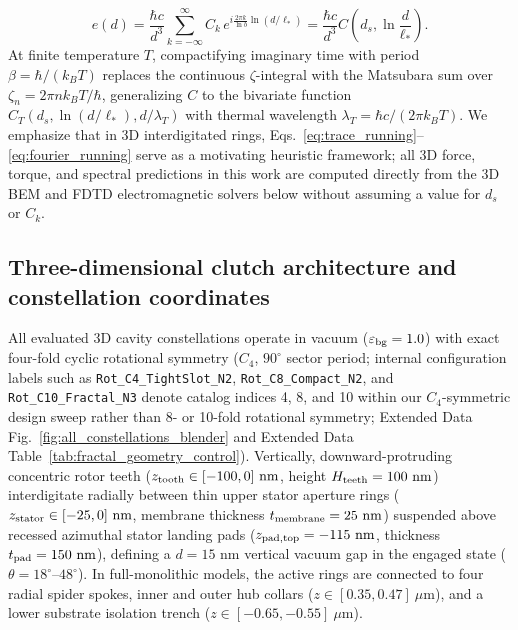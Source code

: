 \documentclass[pdflatex,sn-nature]{sn-jnl}
\begin{document}
\begin{equation}
e(d) = \frac{\hbar c}{d^3} \sum_{k=-\infty}^{\infty} C_k \, e^{i \frac{2\pi k}{\ln b} \ln(d/\ell_*)} = \frac{\hbar c}{d^3} C\!\left(d_s, \ln\frac{d}{\ell_*}\right).
\end{equation}
At finite temperature $T$, compactifying imaginary time with period $\beta = \hbar/(k_B T)$ replaces the continuous $\zeta$-integral with the Matsubara sum over $\zeta_n = 2\pi n k_B T/\hbar$, generalizing $C$ to the bivariate function $C_T(d_s, \ln(d/\ell_*), d/\lambda_T)$ with thermal wavelength $\lambda_T = \hbar c / (2\pi k_B T)$\cite{gordon2026prd}. We emphasize that in 3D interdigitated rings, Eqs.~\eqref{eq:trace_running}--\eqref{eq:fourier_running} serve as a motivating heuristic framework; all 3D force, torque, and spectral predictions in this work are computed directly from the 3D BEM and FDTD electromagnetic solvers below without assuming a value for $d_s$ or $C_k$.

\subsection*{Three-dimensional clutch architecture and constellation coordinates}
All evaluated 3D cavity constellations operate in vacuum ($\varepsilon_{\rm bg}=1.0$) with exact four-fold cyclic rotational symmetry ($C_4$, $90^\circ$ sector period; internal configuration labels such as \texttt{Rot\_C4\_TightSlot\_N2}, \texttt{Rot\_C8\_Compact\_N2}, and \texttt{Rot\_C10\_Fractal\_N3} denote catalog indices 4, 8, and 10 within our $C_4$-symmetric design sweep rather than 8- or 10-fold rotational symmetry; Extended Data Fig.~\ref{fig:all_constellations_blender} and Extended Data Table~\ref{tab:fractal_geometry_control}). Vertically, downward-protruding concentric rotor teeth ($z_{\rm tooth} \in [-100, 0]\text{ nm}$, height $H_{\rm teeth} = 100\text{ nm}$) interdigitate radially between thin upper stator aperture rings ($z_{\rm stator} \in [-25, 0]\text{ nm}$, membrane thickness $t_{\rm membrane} = 25\text{ nm}$) suspended above recessed azimuthal stator landing pads ($z_{\rm pad,top} = -115\text{ nm}$, thickness $t_{\rm pad} = 150\text{ nm}$), defining a $d = 15\text{ nm}$ vertical vacuum gap in the engaged state ($\theta = 18^\circ\text{--}48^\circ$). In full-monolithic models, the active rings are connected to four radial spider spokes, inner and outer hub collars ($z \in [0.35, 0.47]\ \mu\text{m}$), and a lower substrate isolation trench ($z \in [-0.65, -0.55]\ \mu\text{m}$).
\end{document}
